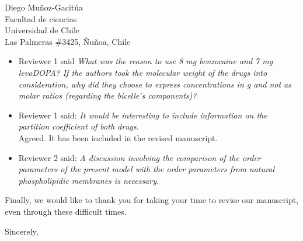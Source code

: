 \documentclass{letter}
\begin{document}
\begin{letter}{Diego Muñoz-Gacitúa\\ Facultad de ciencias \\ Universidad de
    Chile \\ Las Palmeras \#3425, Ñuñoa, Chile}
\begin{itemize}
\item Reviewer 1 said \textit{What was the reason to use 8 mg benzocaine and 7 mg levoDOPA? If the authors took the molecular weight of the drugs into consideration, why did they choose to express concentrations in g and not as molar ratios (regarding the bicelle’s components)?}

\item Reviewer 1 said: \textit{It would be interesting to include information on the partition coefficient of both drugs.}\\
  Agreed. It has been included in the revised manuscript.
  
  \item Reviewer 2 said: \textit{A discussion involving the comparison of the order parameters of the present model with the order parameters from natural phospholipidic membranes is necessary.}\\
  
  

 \end{itemize}

   Finally, we would like to thank you for taking your time to revise our
   manuscript, even through these difficult times.

   \closing{Sincerely,}

 \end{letter}
 
\end{document}
